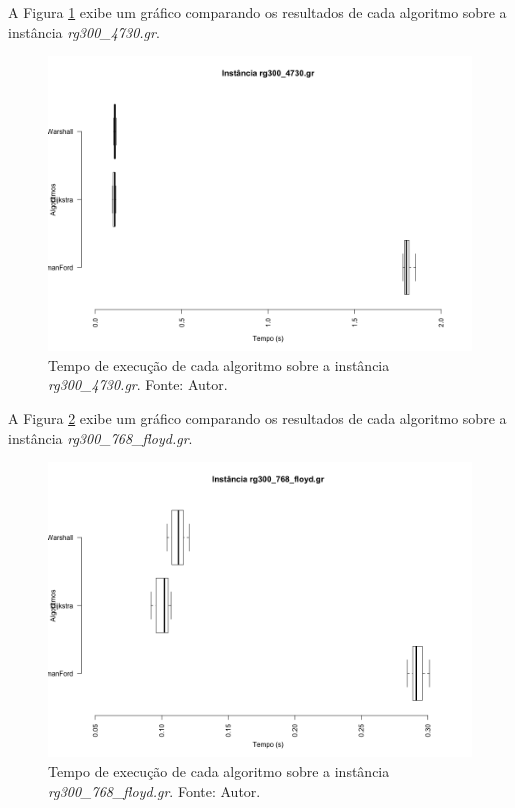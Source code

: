 \documentclass[12pt]{article}
\begin{document}
A Figura \ref{fig:rg300_4730} exibe um gráfico comparando os resultados de cada algoritmo sobre a instância \textit{ rg300\_4730.gr}.

\begin{figure}[H]
  \centering
    \includegraphics[width=1\textwidth]{img/rg300_4730.png}
  \caption{Tempo de execução de cada algoritmo sobre a instância \textit{rg300\_4730.gr}. Fonte: Autor.}
  \label{fig:rg300_4730}
\end{figure}



A Figura \ref{fig:rg300_768_floyd} exibe um gráfico comparando os resultados de cada algoritmo sobre a instância \textit{ rg300\_768\_floyd.gr}.

\begin{figure}[H]
  \centering
    \includegraphics[width=1\textwidth]{img/rg300_768_floyd.png}
  \caption{Tempo de execução de cada algoritmo sobre a instância \textit{rg300\_768\_floyd.gr}. Fonte: Autor.}
  \label{fig:rg300_768_floyd}
\end{figure}
\end{document}
